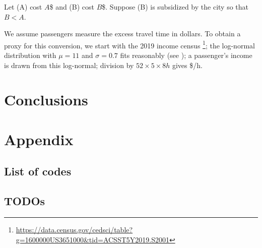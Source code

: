 \documentclass[12pt,notitlepage]{article}
\begin{document}
%

Let
(A) cost $A$\$
and
(B) cost $B$\$.
%
Suppose (B) is subsidized by the city so that $B < A$.
%
%

We assume
passengers measure the excess travel time
in dollars.
%
To obtain a proxy for this conversion, we start with the 2019 income census%
\footnote{\href{https://data.census.gov/cedsci/table?g=1600000US3651000&tid=ACSST5Y2019.S2001&hidePreview=true&moe=false}{https://data.census.gov/cedsci/table?g=1600000US3651000\&tid=ACSST5Y2019.S2001}};
%
the log-normal distribution with $\mu = 11$ and $\sigma = 0.7$ fits reasonably
(see );
%
a passenger's income is drawn from this log-normal;
%
division by $52 \times 5 \times 8 \si{h}$ gives \$/h.

%








\section{Conclusions}




\clearpage
\renewcommand*{\bibfont}{\normalfont\small}
\printbibliography %




\section{Appendix}

\subsection{List of codes} \label{s:code}

\begin{center}
\SHOWCODES
\end{center}


\subsection{TODOs} 
\SHOWTODOS



\leavevmode\vfill{\tiny\color{lightgray}\hfill{\DTMnow}}
\end{document}
